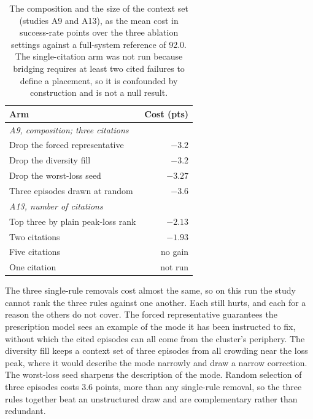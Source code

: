 \documentclass[letterpaper]{article}
\begin{document}
\begin{table}[t]
\centering
\caption{The composition and the size of the context set (studies A9 and A13), as the
mean cost in success-rate points over the three ablation settings against a
full-system reference of 92.0. The single-citation arm was not run because bridging
requires at least two cited failures to define a placement, so it is confounded by
construction and is not a null result.}
\label{tab:context}
\begin{tabular}{lr}
\toprule
Arm & Cost (pts) \\
\midrule
\multicolumn{2}{l}{\emph{A9, composition; three citations}} \\
Drop the forced representative & $-3.2$ \\
Drop the diversity fill & $-3.2$ \\
Drop the worst-loss seed & $-3.27$ \\
Three episodes drawn at random & $-3.6$ \\
\midrule
\multicolumn{2}{l}{\emph{A13, number of citations}} \\
Top three by plain peak-loss rank & $-2.13$ \\
Two citations & $-1.93$ \\
Five citations & no gain \\
One citation & not run \\
\bottomrule
\end{tabular}
\end{table}

The three single-rule removals cost almost the same, so on this run the study cannot
rank the three rules against one another. Each still hurts, and each for a reason the
others do not cover. The forced representative guarantees the prescription model sees an
example of the mode it has been instructed to fix, without which the cited episodes can
all come from the cluster's periphery. The diversity fill keeps a context set of three
episodes from all crowding near the loss peak, where it would describe the mode narrowly
and draw a narrow correction. The worst-loss seed sharpens the description of the mode.
Random selection of three episodes costs 3.6 points, more than any single-rule removal,
so the three rules together beat an unstructured draw and are complementary rather than
redundant.
\end{document}
